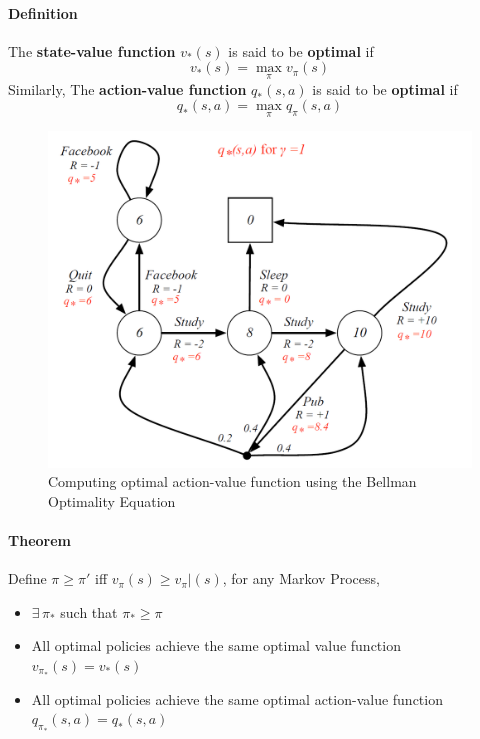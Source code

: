 \documentclass{article}
\begin{document}
	\paragraph{Definition} The \textbf{ state-value function} $v_*(s)$ is said to be \textbf{optimal} if 
	\begin{equation*}
	v_*(s) = \max_\pi v_\pi (s)
	\end{equation*}
	Similarly, The \textbf{ action-value function} $q_*(s,a)$ is said to be \textbf{optimal} if 
	\begin{equation*}
	q_*(s,a) = \max_\pi q_\pi (s,a)
	\end{equation*}
	
	
	\begin{figure}[h]
		\centering
		\includegraphics[scale=0.5]{ch2fig5.png}
		\caption{Computing optimal action-value function using the Bellman Optimality Equation}
	\end{figure}
	
	\paragraph*{Theorem}
	Define $\pi \ge \pi'$ iff $v_\pi(s) \ge v_{\pi}|(s)$, for any Markov Process,
	\begin{itemize}
		\item $\exists \, \pi_*$ such that $\pi_* \ge \pi$
		\item All optimal policies achieve the same optimal value function $v_{\pi_*}(s) = v_*(s)$
		\item All optimal policies achieve the same optimal action-value function $q_{\pi_*}(s,a) = q_*(s,a)$
	\end{itemize}
	
\end{document}
